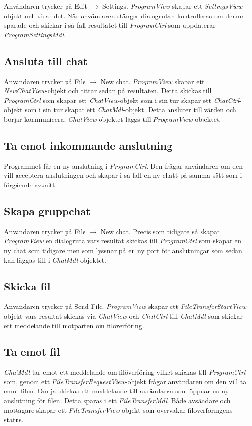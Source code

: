 \documentclass{article}
\begin{document}
Användaren trycker på Edit $\rightarrow$ Settings. \emph{ProgramView} skapar ett \emph{SettingsView}-objekt och visar det. När användaren stänger dialogrutan kontrolleras om denne sparade och skickar i så fall resultatet till \emph{ProgramCtrl} som uppdaterar \emph{ProgramSettingsMdl}.

\subsection{Ansluta till chat}

Användaren trycker på File $\rightarrow$ New chat. \emph{ProgramView} skapar ett \emph{NewChatView}-objekt och tittar sedan på resultaten. Detta skickas till \emph{ProgramCtrl} som skapar ett \emph{ChatView}-objekt som i sin tur skapar ett \emph{ChatCtrl}-objekt som i sin tur skapar ett \emph{ChatMdl}-objekt. Detta ansluter till värden och börjar kommunicera. \emph{ChatView}-objektet läggs till \emph{ProgramView}-objektet.

\subsection{Ta emot inkommande anslutning}

Programmet får en ny anslutning i \emph{ProgramCtrl}. Den frågar användaren om den vill acceptera anslutningen och skapar i så fall en ny chatt på samma sätt som i förgående avsnitt.

\subsection{Skapa gruppchat}

Användaren trycker på File $\rightarrow$ New chat. Precis som tidigare så skapar \emph{ProgramView} en dialogruta vars resultat skickas till \emph{ProgramCtrl} som skapar en ny chat som tidigare men som lyssnar på en ny port för anslutningar som sedan kan läggas till i \emph{ChatMdl}-objektet.

\subsection{Skicka fil}

Användaren trycker på Send File. \emph{ProgramView} skapar ett \emph{FileTransferStartView}-objekt vars resultat skickas via \emph{ChatView} och \emph{ChatCtrl} till \emph{ChatMdl} som skickar ett meddelande till motparten om filöverföring.

\subsection{Ta emot fil}

\emph{ChatMdl} tar emot ett meddelande om filöverföring vilket skickas till \emph{ProgramCtrl} som, genom ett \emph{FileTransferRequestView}-objekt frågar användaren om den vill ta emot filen. Om ja skickas ett meddelande till avsändaren som öppnar en ny anslutning för filen. Detta sparas i ett \emph{FileTransferMdl}. Både avsändare och mottagare skapar ett \emph{FileTransferView}-objekt som övervakar filöverföringens status.
\end{document}
